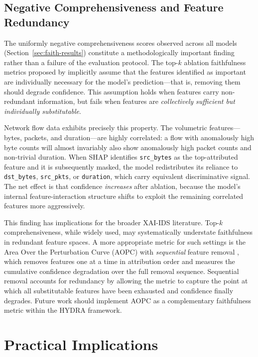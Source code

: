 \documentclass[12pt,a4paper]{report}
\begin{document}
\subsection*{Negative Comprehensiveness and Feature Redundancy}
\label{sec:neg-comp}

The uniformly negative comprehensiveness scores observed across all models (Section~\ref{sec:faith-results}) constitute a methodologically important finding rather than a failure of the evaluation protocol. The top-$k$ ablation faithfulness metrics proposed by \citet{deyoung2020} implicitly assume that the features identified as important are individually necessary for the model's prediction---that is, removing them should degrade confidence. This assumption holds when features carry non-redundant information, but fails when features are \textit{collectively sufficient but individually substitutable}.

Network flow data exhibits precisely this property. The volumetric features---bytes, packets, and duration---are highly correlated: a flow with anomalously high byte counts will almost invariably also show anomalously high packet counts and non-trivial duration. When SHAP identifies \texttt{src\_bytes} as the top-attributed feature and it is subsequently masked, the model redistributes its reliance to \texttt{dst\_bytes}, \texttt{src\_pkts}, or \texttt{duration}, which carry equivalent discriminative signal. The net effect is that confidence \textit{increases} after ablation, because the model's internal feature-interaction structure shifts to exploit the remaining correlated features more aggressively.

This finding has implications for the broader XAI-IDS literature. Top-$k$ comprehensiveness, while widely used, may systematically understate faithfulness in redundant feature spaces. A more appropriate metric for such settings is the Area Over the Perturbation Curve (AOPC) with \textit{sequential} feature removal \citep{samek2017}, which removes features one at a time in attribution order and measures the cumulative confidence degradation over the full removal sequence. Sequential removal accounts for redundancy by allowing the metric to capture the point at which all substitutable features have been exhausted and confidence finally degrades. Future work should implement AOPC as a complementary faithfulness metric within the HYDRA framework.

\section{Practical Implications}
\label{sec:practical}
\end{document}
